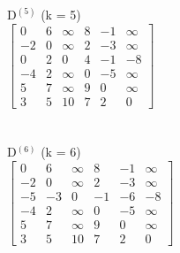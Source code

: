 \documentclass[11pt]{article}
\begin{document}
\vspace*{3ex}D$^{(5)}$ (k = 5)\\
$\begin{bmatrix}
0 & 6 & \infty & 8 & -1 & \infty\\
-2 & 0 & \infty & 2 & -3 & \infty\\
0 & 2 & 0 & 4 & -1 & -8\\
-4 & 2 & \infty & 0 & -5 & \infty\\
5 & 7 & \infty & 9 & 0 & \infty\\
3 & 5 & 10 & 7 & 2 & 0
\end{bmatrix}$\\\\\\
\vspace*{3ex}D$^{(6)}$ (k = 6)\\
$\begin{bmatrix}
0 & 6 & \infty & 8 & -1 & \infty\\
-2 & 0 & \infty & 2 & -3 & \infty\\
-5 & -3 & 0 & -1 & -6 & -8\\
-4 & 2 & \infty & 0 & -5 & \infty\\
5 & 7 & \infty & 9 & 0 & \infty\\
3 & 5 & 10 & 7 & 2 & 0
\end{bmatrix}$\\\\\\
\end{document}

